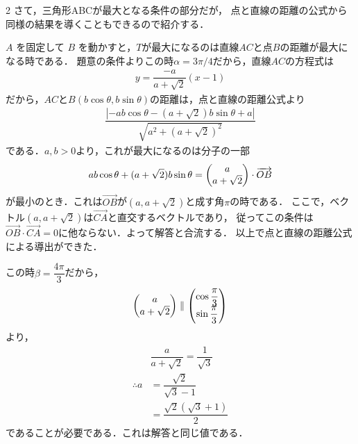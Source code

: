 \documentclass[../../main.tex]{subfiles}
\begin{document}
\begin{multicols}{2}
  さて，三角形ABCが最大となる条件の部分だが，
  点と直線の距離の公式から同様の結果を導くこともできるので紹介する．

  $A$ を固定して $B$ を動かすと，$T$が最大になるのは直線$AC$と点$B$の距離が最大になる時である．
  題意の条件よりこの時$\alpha=3\pi/4$だから，直線$AC$の方程式は
  \begin{align}
    y = \dfrac{-a}{a+\sqrt{2}}(x-1)
  \end{align}
  だから，$AC$と$B(b\cos\theta,b\sin\theta)$の距離は，点と直線の距離公式より
  \begin{align}
    \dfrac{\left| -ab\cos\theta - (a+\sqrt{2})b\sin\theta +a\right|}{\sqrt{a^2+(a+\sqrt{2})^2}}
  \end{align}
  である．$a,b>0$より，これが最大になるのは分子の一部
  \begin{align}
    ab\cos\theta + (a+\sqrt{2})b\sin\theta = \mqty(a \\ a+\sqrt{2}) \cdot \overrightarrow{OB}
  \end{align}
  が最小のとき．これは$\overrightarrow{OB}$が$(a,a+\sqrt{2})$と成す角$\pi$の時である．
  ここで，ベクトル$(a,a+\sqrt{2})$は$\overrightarrow{CA}$と直交するベクトルであり，
  従ってこの条件は$\overrightarrow{OB}\cdot\overrightarrow{CA}=0$に他ならない．よって解答と合流する．
  以上で点と直線の距離公式による導出ができた．

  この時$\beta=\dfrac{4\pi}{3}$だから，
  \begin{align}
    \mqty(a \\ a+\sqrt{2}) \parallel \mqty(\cos\dfrac{\pi}{3} \\ \sin\dfrac{\pi}{3})
  \end{align}
  より，
  \begin{align}
    & \dfrac{a}{a+\sqrt{2}} = \dfrac{1}{\sqrt{3}} \\
    \therefore
    a & = \dfrac{\sqrt{2}}{\sqrt{3}-1}             \\
    & = \dfrac{\sqrt{2}(\sqrt{3}+1)}{2}
  \end{align}
  であることが必要である．これは解答と同じ値である．





\end{multicols}
\end{document}
